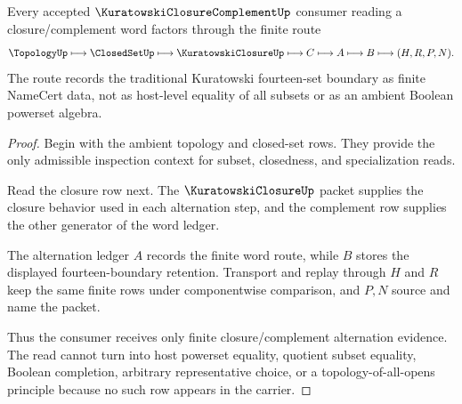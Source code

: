 \begin{theorem}
\label{thm:kuratowski-closure-complement-fourteen-route}
Every accepted $\KuratowskiClosureComplementUp$ consumer reading a closure/complement word factors through the finite route
$$
\TopologyUp\longmapsto\ClosedSetUp\longmapsto\KuratowskiClosureUp\longmapsto C\longmapsto A\longmapsto B\longmapsto(H,R,P,N).
$$
The route records the traditional Kuratowski fourteen-set boundary as finite NameCert data, not as host-level equality of all subsets or as an ambient Boolean powerset algebra.
\end{theorem}
\begin{proof}
Begin with the ambient topology and closed-set rows. They provide the only admissible inspection context for subset, closedness, and specialization reads.

Read the closure row next. The $\KuratowskiClosureUp$ packet supplies the closure behavior used in each alternation step, and the complement row supplies the other generator of the word ledger.

The alternation ledger $A$ records the finite word route, while $B$ stores the displayed fourteen-boundary retention. Transport and replay through $H$ and $R$ keep the same finite rows under componentwise comparison, and $P,N$ source and name the packet.

Thus the consumer receives only finite closure/complement alternation evidence. The read cannot turn into host powerset equality, quotient subset equality, Boolean completion, arbitrary representative choice, or a topology-of-all-opens principle because no such row appears in the carrier.
\end{proof}


\begin{closurestatus}{\KuratowskiClosureComplementUp}
  \theoryclosure{\seedClosure}
  \formalstatus{\unformalizedV}
\end{closurestatus}
